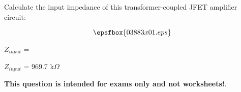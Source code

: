 

Calculate the input impedance of this transformer-coupled JFET amplifier circuit:

$$\epsfbox{03883x01.eps}$$

$Z_{input}$ = 







$Z_{input}$ = 969.7 k$\Omega$







{\bf This question is intended for exams only and not worksheets!}.




